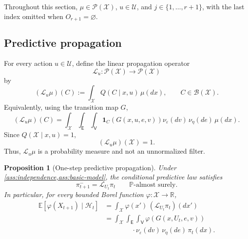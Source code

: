\documentclass[10pt,twocolumn]{article}
\newtheorem{proposition}{Proposition}
\theoremstyle{remark}
\newcommand{\R}{\mathbb{R}}
\newcommand{\E}{\mathbb{E}}
\newcommand{\Pp}{\mathbb{P}}
\newcommand{\B}{\mathcal{B}}
\newcommand{\Hh}{\mathcal{H}}
\newcommand{\Pcal}{\mathcal{P}}
\newcommand{\Ucal}{\mathcal{U}}
\newcommand{\Xcal}{\mathcal{X}}
\newcommand{\one}{\mathbf{1}}
\begin{document}
Throughout this section, \(\mu\in\Pcal(\Xcal)\), \(u\in\Ucal\), and \(j\in\{1,\ldots,r+1\}\), with the last index omitted when \(O_{r+1}=\varnothing\).

\subsection{Predictive propagation}
\label{subsec:predictive-propagation}

For every action \(u\in\Ucal\), define the linear propagation operator
\begin{equation*}
	\mathcal L_u:\Pcal(\Xcal)\longrightarrow\Pcal(\Xcal)
	\label{eq:predictive-operator-domain}
\end{equation*}
by
\begin{equation}
	(\mathcal L_u\mu)(C)
	:=
	\int_{\Xcal}Q(C\mid x,u)\,\mu(dx),
	\qquad C\in\B(\Xcal).
	\label{eq:predictive-operator}
\end{equation}
Equivalently, using the transition map \(G\),
\begin{equation*}
	(\mathcal L_u\mu)(C)
	=\! \!
	\int_{\Xcal}\int_{\mathsf E}\int_{\mathsf V}\!\!
	\one_C\!\left(G(x,u,e,v)\right)
	\nu_\varepsilon(dv)\,\nu_\eta(de)\,\mu(dx).
	\label{eq:predictive-operator-G}
\end{equation*}
Since \(Q(\Xcal\mid x,u)=1\),
\[
(\mathcal L_u\mu)(\Xcal)=1.
\]
Thus, \(\mathcal L_u\mu\) is a probability measure and not an unnormalized filter.

\begin{proposition}[One-step predictive propagation]
	\label{prop:one-step-prediction}
	Under \cref{ass:independence,ass:basic-model}, the conditional predictive law satisfies
	\begin{equation}
		\pi_{t+1}^{-}=\mathcal L_{U_t}\pi_t
		\qquad \Pp\text{-almost surely}.
		\label{eq:predictive-recursion}
	\end{equation}
	In particular, for every bounded Borel function \(\varphi:\Xcal\to\R\),
\begin{equation}
	\begin{aligned}
		\E[\varphi(X_{t+1})\mid\Hh_t]
		&=
		\int_{\Xcal}
		\varphi(x')\,
		(\mathcal L_{U_t}\pi_t)(dx')
		\\
		&=
		\int_{\Xcal}\int_{\mathsf E}\int_{\mathsf V}
		\varphi\!\left(G(x,U_t,e,v)\right)
		\\
		&\qquad \qquad \cdot
		\nu_\varepsilon(dv)\,
		\nu_\eta(de)\,
		\pi_t(dx).
	\end{aligned}
	\label{eq:prediction-expectation}
\end{equation}
\end{proposition}
\end{document}
